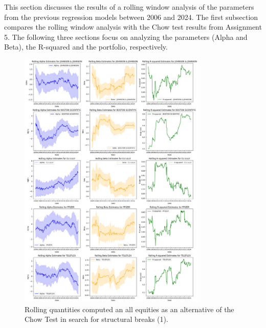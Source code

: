 This section discusses the results of a rolling window analysis of the parameters from the previous regression models between 
2006 and 2024.
The first subsection compares the rolling window analysis with the Chow test results from Assignment 5.
The following three sections focus on analyzing the parameters (Alpha and Beta), the R-squared and the portfolio,
respectively.

\begin{figure}[h]
    \centering
    \includegraphics[width=0.8\textwidth]{images/rolling_quantities_1.png}
    \caption{Rolling quantities computed an all equities as an alternative of the Chow Test in search for structural
    breaks (1).}\label{fig:rolling_quantities_1}
\end{figure}
